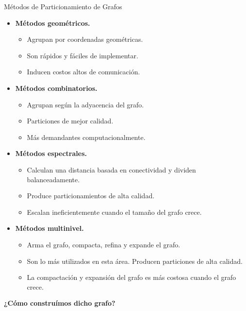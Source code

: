 \begin{frame}{Métodos de Particionamiento de Grafos}

\begin{itemize}
    \item \textbf{Métodos geométricos.}

    \begin{itemize}
        \footnotesize
        \item Agrupan por coordenadas geométricas.

        \item Son rápidos y fáciles de implementar.

        \item Inducen costos altos de comunicación.
    \end{itemize}

    \item \textbf{Métodos combinatorios.}

    \begin{itemize}
        \footnotesize
        \item Agrupan según la adyacencia del grafo.

        \item Particiones de mejor calidad.

        \item Más demandantes computacionalmente.

    \end{itemize}

    \item \textbf{Métodos espectrales.}
    \begin{itemize}
        \footnotesize
        \item Calculan una distancia basada en conectividad y dividen balanceadamente.

        \item Produce particionamientos de alta calidad.

        \item Escalan ineficientemente cuando el tamaño del grafo crece.
    \end{itemize}

    \item \textbf{Métodos multinivel.}

    \begin{itemize}
        \footnotesize
        \item Arma el grafo, compacta, refina y expande el grafo.

        \item Son lo más utilizados en esta área. Producen particiones de alta calidad.

        \item La compactación y expansión del grafo es más costosa cuando el grafo crece.
    \end{itemize}
\end{itemize}
\pause
\centering
\textbf{¿Cómo construímos dicho grafo?}

\end{frame}


